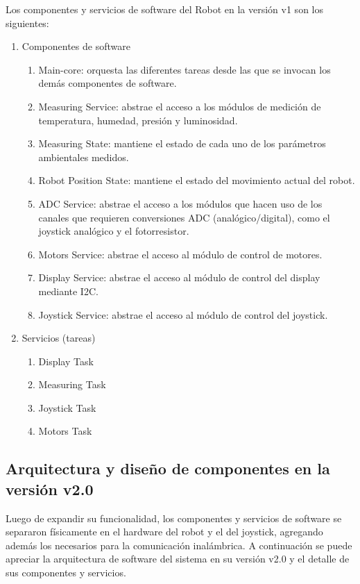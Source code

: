 Los componentes y servicios de software del Robot en la versión v1 son los siguientes:

\begin{enumerate}	
	\item Componentes de software
	\begin{enumerate}			
		\item Main-core: orquesta las diferentes tareas desde las que se invocan los demás componentes de software.
		\item Measuring Service: abstrae el acceso a los módulos de medición de temperatura, humedad, presión y luminosidad.
		\item Measuring State: mantiene el estado de cada uno de los parámetros ambientales medidos.
		\item Robot Position State: mantiene el estado del movimiento actual del robot.
		\item ADC Service: abstrae el acceso a los módulos que hacen uso de los canales que requieren conversiones ADC (analógico/digital), como el joystick analógico y el fotorresistor.
		\item Motors Service: abstrae el acceso al módulo de control de motores.
		\item Display Service: abstrae el acceso al módulo de control del display mediante I2C.
		\item Joystick Service: abstrae el acceso al módulo de control del joystick.
	\end{enumerate}	
	\item Servicios (tareas)
	\begin{enumerate}				
		\item Display Task	
		\item Measuring Task		
		\item Joystick Task
		\item Motors Task		
	\end{enumerate}			
\end{enumerate}		

\subsection{Arquitectura y diseño de componentes en la versión v2.0}

Luego de expandir su funcionalidad, los componentes y servicios de software se separaron físicamente en el hardware del robot y el del joystick, agregando además los necesarios para la comunicación inalámbrica. A continuación se puede apreciar la arquitectura de software del sistema en su versión v2.0 y el detalle de sus componentes y servicios.

